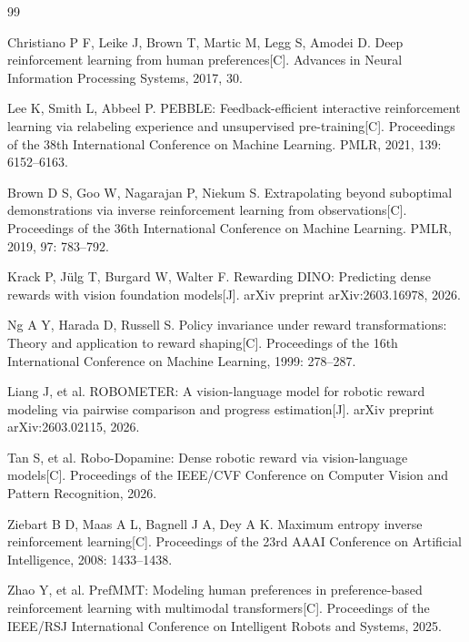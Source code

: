


\clearpage
\begin{thebibliography}{99}

Christiano P F, Leike J, Brown T, Martic M, Legg S, Amodei D.
Deep reinforcement learning from human preferences[C].
Advances in Neural Information Processing Systems, 2017, 30.

Lee K, Smith L, Abbeel P.
PEBBLE: Feedback-efficient interactive reinforcement learning via relabeling experience and unsupervised pre-training[C].
Proceedings of the 38th International Conference on Machine Learning. PMLR, 2021, 139: 6152--6163.

Brown D S, Goo W, Nagarajan P, Niekum S.
Extrapolating beyond suboptimal demonstrations via inverse reinforcement learning from observations[C].
Proceedings of the 36th International Conference on Machine Learning. PMLR, 2019, 97: 783--792.

Krack P, Jülg T, Burgard W, Walter F.
Rewarding DINO: Predicting dense rewards with vision foundation models[J].
arXiv preprint arXiv:2603.16978, 2026.

Ng A Y, Harada D, Russell S.
Policy invariance under reward transformations: Theory and application to reward shaping[C].
Proceedings of the 16th International Conference on Machine Learning, 1999: 278--287.

Liang J, et al.
ROBOMETER: A vision-language model for robotic reward modeling via pairwise comparison and progress estimation[J].
arXiv preprint arXiv:2603.02115, 2026.

Tan S, et al.
Robo-Dopamine: Dense robotic reward via vision-language models[C].
Proceedings of the IEEE/CVF Conference on Computer Vision and Pattern Recognition, 2026.

Ziebart B D, Maas A L, Bagnell J A, Dey A K.
Maximum entropy inverse reinforcement learning[C].
Proceedings of the 23rd AAAI Conference on Artificial Intelligence, 2008: 1433--1438.

Zhao Y, et al.
PrefMMT: Modeling human preferences in preference-based reinforcement learning with multimodal transformers[C].
Proceedings of the IEEE/RSJ International Conference on Intelligent Robots and Systems, 2025.


\end{thebibliography}
